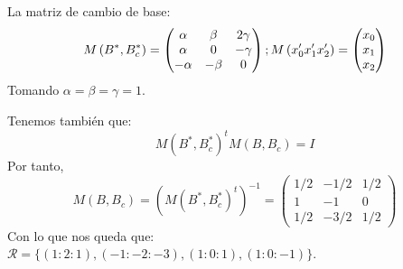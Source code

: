 \documentclass[10pt,a4paper,openright]{book}
\theoremstyle{break}
\begin{document}
La matriz de cambio de base:
\[
    M\left( B^*, B^*_c \right) = \begin{pmatrix} \alpha & \beta & 2\gamma\\ \alpha & 0 & -\gamma\\ -\alpha & -\beta & 0 \end{pmatrix}; M\left( x_0'\\ x_1'\\ x_2' \right) = \begin{pmatrix} x_0\\ x_1\\ x_2 \end{pmatrix}  
\]
Tomando $\alpha = \beta = \gamma = 1$. 

Tenemos también que:
\[
M\left( B^*, B^*_c \right)^t M\left( B, B_c \right) = I
\]
Por tanto, 
\[
    M\left( B, B_c \right) = \left( M\left( B^*, B^*_c \right)^t \right)^{-1} = \begin{pmatrix} 1/2 & -1/2 & 1/2\\ 1 & -1 & 0\\ 1/2 & -3/2 & 1/2 \end{pmatrix} 
\]
Con lo que nos queda que: $\mathcal{R} = \{\left( 1 : 2 : 1 \right), \left( -1 : -2 : -3 \right), \left( 1 : 0 : 1 \right), \left( 1 : 0 : -1 \right)\}$.
\end{document}
